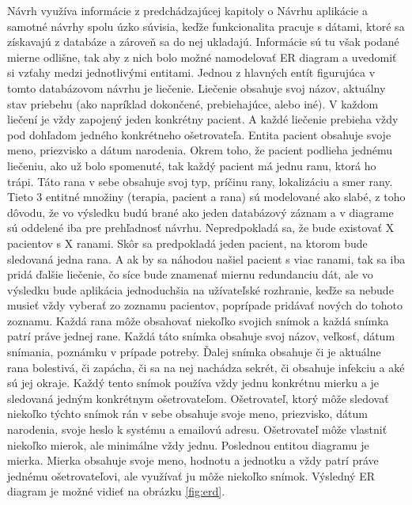 Návrh využíva informácie  z predchádzajúcej kapitoly o Návrhu aplikácie a samotné návrhy spolu úzko súvisia, keďže funkcionalita pracuje s dátami, ktoré sa získavajú z databáze a zároveň sa do nej ukladajú. Informácie sú tu však podané mierne odlišne, tak aby z nich bolo možné namodelovať ER diagram a uvedomiť si vzťahy medzi jednotlivými entitami. Jednou z hlavných entít figurujúca v tomto databázovom návrhu je liečenie. Liečenie obsahuje svoj názov, aktuálny stav priebehu (ako napríklad dokončené, prebiehajúce, alebo iné). V každom liečení je vždy zapojený jeden konkrétny pacient. A každé liečenie prebieha vždy pod dohľadom jedného konkrétneho ošetrovateľa. Entita pacient obsahuje svoje meno, priezvisko a dátum narodenia. Okrem toho, že pacient podlieha jednému liečeniu, ako už bolo spomenuté, tak každý pacient má jednu ranu, ktorá ho trápi. Táto rana v sebe obsahuje svoj typ, príčinu rany, lokalizáciu a smer rany. Tieto 3 entitné množiny (terapia, pacient a rana) sú modelované ako slabé, z toho dôvodu, že vo výsledku budú brané ako jeden databázový záznam a v diagrame sú oddelené iba pre prehľadnosť návrhu. Nepredpokladá sa, že bude existovať X pacientov s X ranami. Skôr sa predpokladá jeden pacient, na ktorom bude sledovaná jedna rana. A ak by sa náhodou našiel pacient s viac ranami, tak sa iba pridá ďalšie liečenie, čo síce bude znamenať miernu redundanciu dát, ale vo výsledku bude aplikácia jednoduchšia na užívateľské rozhranie, keďže sa nebude musieť vždy vyberať zo zoznamu pacientov, poprípade pridávať nových do tohoto zoznamu. Každá rana môže obsahovať niekoľko svojich snímok a každá snímka patrí práve jednej rane. Každá táto snímka obsahuje svoj názov, veľkosť, dátum snímania, poznámku v prípade potreby. Ďalej snímka obsahuje či je aktuálne rana bolestivá, či zapácha, či sa na nej nachádza sekrét, či obsahuje infekciu a aké sú jej okraje. Každý tento snímok používa vždy jednu konkrétnu mierku a je sledovaná jedným konkrétnym ošetrovateľom. Ošetrovateľ, ktorý môže sledovať niekoľko týchto snímok rán v sebe obsahuje svoje meno, priezvisko, dátum narodenia, svoje heslo k systému a emailovú adresu. Ošetrovateľ môže vlastniť niekoľko mierok, ale minimálne vždy jednu. Poslednou entitou diagramu je mierka. Mierka obsahuje svoje meno, hodnotu a jednotku a vždy patrí práve jednému ošetrovateľovi, ale využívať ju môže niekoľko snímok. Výsledný ER diagram je možné vidieť na obrázku \ref{fig:erd}.
